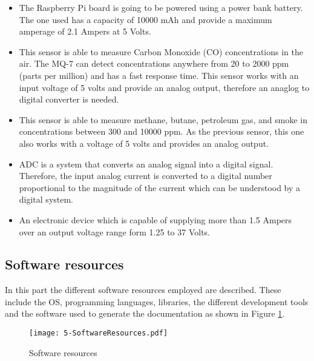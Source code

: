 \begin{itemize}
	\item {} The Raspberry Pi board is going to be powered using a power bank battery. The one used has a capacity of 10000 mAh and provide a maximum amperage of 2.1 Ampers at 5 Volts.
	
	\item {} This sensor is able to measure Carbon Monoxide (CO) concentrations in the air. The MQ-7 can detect concentrations anywhere from 20 to 2000 ppm (parts per million) and has a fast response time. This sensor works with an input voltage of 5 volts and provide an analog output, therefore an anaglog to digital converter is needed.
	
	\item {} This sensor is able to measure methane, butane, petroleum gas, and smoke in concentrations between 300 and 10000 ppm. As the previous sensor, this one also works with a voltage of 5 volts and provides an analog output.
	
	\item {} \ac{ADC} is a system that converts an analog signal into a digital signal. Therefore, the input analog current is converted to a digital number proportional to the magnitude of the current which can be understood by a digital system.	
	
	\item {} An electronic device which is capable of supplying more than 1.5 Ampers over an output voltage range form 1.25 to 37 Volts.
	
\end{itemize} 

\subsection{Software resources}
In this part the different software resources employed are described. These include the \ac{OS}, programming languages, libraries, the different development tools and the software used to generate the documentation as shown in Figure \ref{fig:5-SoftwareResources}.

\begin{figure}[!h]
	\begin{center}
		\texttt{[image: 5-SoftwareResources.pdf]}
		\caption{Software resources}
		\label{fig:5-SoftwareResources}
	\end{center}
\end{figure}

